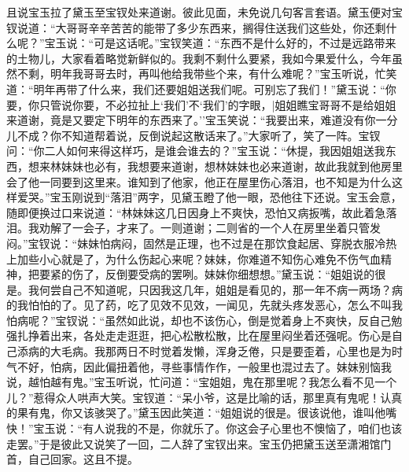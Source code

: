 且说宝玉拉了黛玉至宝钗处来道谢。彼此见面，未免说几句客言套语。黛玉便对宝钗说道：``大哥哥辛辛苦苦的能带了多少东西来，搁得住送我们这些处，你还剩什么呢？''宝玉说：``可是这话呢。''宝钗笑道：``东西不是什么好的，不过是远路带来的土物儿，大家看着略觉新鲜似的。我剩不剩什么要紧，我如今果爱什么，今年虽然不剩，明年我哥哥去时，再叫他给我带些个来，有什么难呢？''宝玉听说，忙笑道：``明年再带了什么来，我们还要姐姐送我们呢。可别忘了我们！''黛玉说：``你要，你只管说你要，不必拉扯上`我们'不`我们'的字眼，|姐姐瞧宝哥哥不是给姐姐来道谢，竟是又要定下明年的东西来了。''宝玉笑说：``我要出来，难道没有你一分儿不成？你不知道帮着说，反倒说起这散话来了。''大家听了，笑了一阵。宝钗问：``你二人如何来得这样巧，是谁会谁去的？''宝玉说：``休提，我因姐姐送我东西，想来林妹妹也必有，我想要来道谢，想林妹妹也必来道谢，故此我就到他房里会了他一同要到这里来。谁知到了他家，他正在屋里伤心落泪，也不知是为什么这样爱哭。''宝玉刚说到``落泪''两字，见黛玉瞪了他一眼，恐他往下还说。宝玉会意，随即便换过口来说道：``林妹妹这几日因身上不爽快，恐怕又病扳嘴，故此着急落泪。我劝解了一会子，才来了。一则道谢；二则省的一个人在房里坐着只管发闷。''宝钗说：``妹妹怕病闷，固然是正理，也不过是在那饮食起居、穿脱衣服冷热上加些小心就是了，为什么伤起心来呢？妹妹，你难道不知伤心难免不伤气血精神，把要紧的伤了，反倒要受病的罢咧。妹妹你细想想。''黛玉说：``姐姐说的很是。我何尝自己不知道呢，只因我这几年，姐姐是看见的，那一年不病一两场？病的我怕怕的了。见了药，吃了见效不见效，一闻见，先就头疼发恶心，怎么不叫我怕病呢？''宝钗说：``虽然如此说，却也不该伤心，倒是觉着身上不爽快，反自己勉强扎挣着出来，各处走走逛逛，把心松散松散，比在屋里闷坐着还强呢。伤心是自己添病的大毛病。我那两日不时觉着发懒，浑身乏倦，只是要歪着，心里也是为时气不好，怕病，因此偏扭着他，寻些事情作作，一般里也混过去了。妹妹别恼我说，越怕越有鬼。''宝玉听说，忙问道：``宝姐姐，鬼在那里呢？我怎么看不见一个儿？''惹得众人哄声大笑。宝钗道：``呆小爷，这是比喻的话，那里真有鬼呢！认真的果有鬼，你又该骇哭了。''黛玉因此笑道：``姐姐说的很是。很该说他，谁叫他嘴快！''宝玉说：``有人说我的不是，你就乐了。你这会子心里也不懊恼了，咱们也该走罢。''于是彼此又说笑了一回，二人辞了宝钗出来。宝玉仍把黛玉送至潇湘馆门首，自己回家。这且不提。

